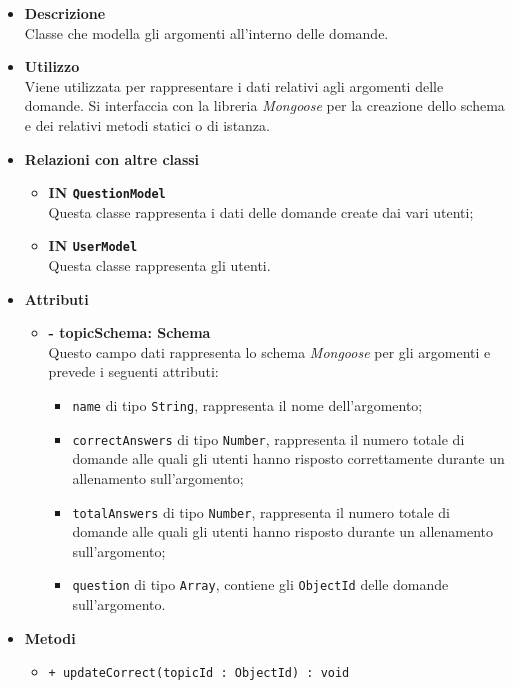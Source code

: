 \begin{itemize}
	\item \textbf{Descrizione} \\
	Classe che modella gli argomenti all'interno delle domande.
	\item \textbf{Utilizzo} \\
	Viene utilizzata per rappresentare i dati relativi agli argomenti delle domande. Si interfaccia con la libreria \textit{Mongoose} per la creazione dello schema e dei relativi metodi statici o di istanza.
	\item \textbf{Relazioni con altre classi}
		\begin{itemize}
			\item \textbf{IN \texttt{QuestionModel}} \\
			Questa classe rappresenta i dati delle domande create dai vari utenti;
			\item \textbf{IN \texttt{UserModel}} \\
			Questa classe rappresenta gli utenti.
		\end{itemize}
	\item \textbf{Attributi}
		\begin{itemize}
			\item \textbf{- topicSchema: Schema} \\
			Questo campo dati rappresenta lo schema \textit{Mongoose} per gli argomenti e prevede i seguenti attributi:
				\begin{itemize}
					\item \texttt{name} di tipo \texttt{String}, rappresenta il nome dell'argomento;
					\item \texttt{correctAnswers} di tipo \texttt{Number}, rappresenta il numero totale di domande alle quali gli utenti hanno risposto correttamente durante un allenamento sull'argomento; 
					\item \texttt{totalAnswers} di tipo \texttt{Number}, rappresenta il numero totale di domande alle quali gli utenti hanno risposto durante un allenamento sull'argomento;
					\item \texttt{question} di tipo \texttt{Array}, contiene gli \texttt{ObjectId} delle domande sull'argomento.
				\end{itemize}
		\end{itemize}
	\item \textbf{Metodi}
		\begin{itemize}
			\item \texttt{+ updateCorrect(topicId : ObjectId) : void} \\

\end{itemize}
\end{itemize}
